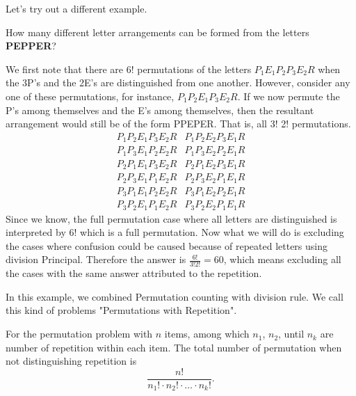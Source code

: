         Let's try out a different example.
        \begin{example}
            How many different letter arrangements can be formed from the letters \textbf{PEPPER}?
        \begin{solution}
            We first note that there are $6!$ permutations of the letters $P_1E_1P_2P_3E_2R$ when the 3P’s and the 2E’s are distinguished from one another. However, consider any one of these permutations, for instance, $P_1P_2E_1P_3E_2R$. If we now permute the P’s among themselves and the E’s among themselves, then the resultant arrangement would still be of the form PPEPER. That is, all 3! 2! permutations.$$\begin{array}{ll}P_{1} P_{2} E_{1} P_{3} E_{2} R & P_{1} P_{2} E_{2} P_{3} E_{1} R \\P_{1} P_{3} E_{1} P_{2} E_{2} R & P_{1} P_{3} E_{2} P_{2} E_{1} R \\P_{2} P_{1} E_{1} P_{3} E_{2} R & P_{2} P_{1} E_{2} P_{3} E_{1} R \\P_{2} P_{3} E_{1} P_{1} E_{2} R & P_{2} P_{3} E_{2} P_{1} E_{1} R \\P_{3} P_{1} E_{1} P_{2} E_{2} R & P_{3} P_{1} E_{2} P_{2} E_{1} R \\P_{3} P_{2} E_{1} P_{1} E_{2} R & P_{3} P_{2} E_{2} P_{1} E_{1} R\end{array}$$
            Since we know, the full permutation case where all letters are distinguished is interpreted by $6!$ which is a full permutation. Now what we will do is excluding the cases where confusion could be caused because of repeated letters using division Principal. Therefore the answer is $\frac{6!}{3!2!} = 60$, which means excluding all the cases with the same answer attributed to the repetition. 
        \end{solution}
        \end{example}
        In this example, we combined Permutation counting with division rule.
        We call this kind of problems "Permutations with Repetition".

        \begin{definition} \label{PR}
            For the permutation problem with $n$ items, among which $n_1$, $n_2$, until
            $n_k$ are number of repetition within each item. The total number of 
            permutation when not distinguishing repetition is
            $$ \frac{n!}{n_1! \cdot n_2! \cdot \ldots \cdot n_k!}.$$
         \end{definition}

